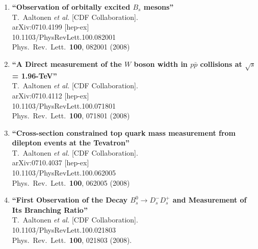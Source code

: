 \documentclass{article}
\begin{document}
\begin{enumerate}
\item%
{\bf ``Observation of orbitally excited $B_s$ mesons''}
  \\{}T.~Aaltonen {\it et al.}  [CDF Collaboration].
  \\{}arXiv:0710.4199 [hep-ex]
    \\{}10.1103/PhysRevLett.100.082001
\\{}Phys.\ Rev.\ Lett.\  {\bf 100}, 082001 (2008) %


\item%
{\bf ``A Direct measurement of the $W$ boson width in $p \bar{p}$ collisions at $\sqrt{s}$ = 1.96-TeV''}
  \\{}T.~Aaltonen {\it et al.}  [CDF Collaboration].
  \\{}arXiv:0710.4112 [hep-ex]
    \\{}10.1103/PhysRevLett.100.071801
\\{}Phys.\ Rev.\ Lett.\  {\bf 100}, 071801 (2008) %


\item%
{\bf ``Cross-section constrained top quark mass measurement from dilepton events at the Tevatron''}
  \\{}T.~Aaltonen {\it et al.}  [CDF Collaboration].
  \\{}arXiv:0710.4037 [hep-ex]
    \\{}10.1103/PhysRevLett.100.062005
\\{}Phys.\ Rev.\ Lett.\  {\bf 100}, 062005 (2008) %


\item%
{\bf ``First Observation of the Decay $B_s^0 \to D_s^- D_s^+$ and Measurement of Its Branching Ratio''}
  \\{}T.~Aaltonen {\it et al.}  [CDF Collaboration].
    \\{}10.1103/PhysRevLett.100.021803
\\{}Phys.\ Rev.\ Lett.\  {\bf 100}, 021803 (2008). %



\end{enumerate}
\end{document}
